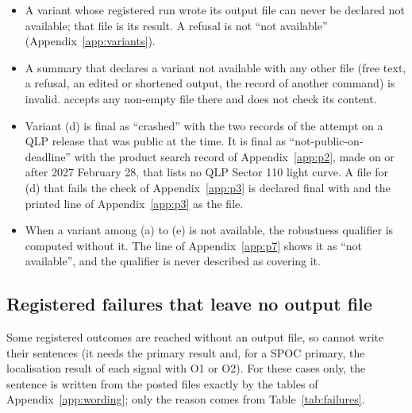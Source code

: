 \begin{itemize}
  Appendix~\ref{app:p3}).
\item A variant whose registered run wrote its output file can never be declared not available; that file is its
  result. A refusal is not ``not available'' (Appendix~\ref{app:variants}).
\item A summary that declares a variant not available with any other file (free text, a refusal, an edited or
  shortened output, the record of another command) is invalid.  accepts any non-empty file there
  and does not check its content.
\item Variant (d) is final as ``crashed'' with the two records of the attempt on a QLP release that was public at the
  time. It is final as ``not-public-on-deadline'' with the product search record of Appendix~\ref{app:p2}, made on or
  after 2027 February 28, that lists no QLP Sector 110 light curve. A file for (d) that fails the check of
  Appendix~\ref{app:p3} is declared final with  and the printed line of
  Appendix~\ref{app:p3} as the file.
\item When a variant among (a) to (e) is not available, the robustness qualifier is computed without it. The line of
  Appendix~\ref{app:p7} shows it as ``not available'', and the qualifier is never described as covering it.
\end{itemize}

\subsection{Registered failures that leave no output file} \label{app:p5}

Some registered outcomes are reached without an output file, so  cannot write their sentences
(it needs the primary result and, for a SPOC primary, the localisation result of each signal with O1 or O2). For these
cases only, the sentence is written from the posted files exactly by the tables of Appendix~\ref{app:wording}; only the
reason comes from Table~\ref{tab:failures}.


